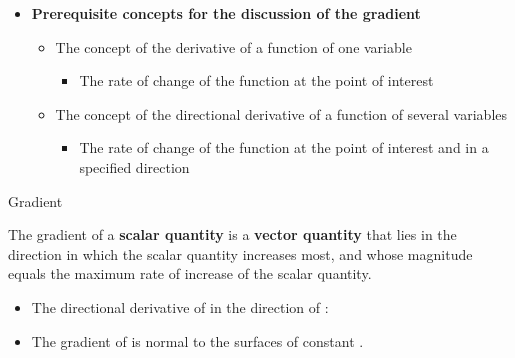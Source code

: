 
\begin{ELunit}

\begin{itemize}
\tightlist
\item
  \textbf{Prerequisite concepts for the discussion of the gradient}

  \begin{itemize}
  \tightlist
  \item
    The concept of the derivative of a function of one variable

    \begin{itemize}
    \tightlist
    \item
      The rate of change of the function at the point of interest
    \end{itemize}
  \item
    The concept of the directional derivative of a function of several variables

    \begin{itemize}
    \tightlist
    \item
      The rate of change of the function at the point of interest and in a specified direction
    \end{itemize}
  \end{itemize}
\end{itemize}


\end{ELunit}

\begin{ELdefinition}{Gradient}

The gradient of a \textbf{scalar quantity} is a \textbf{vector quantity} that lies in the direction in which the scalar quantity increases most, and whose magnitude equals the maximum rate of increase of the scalar quantity.


\end{ELdefinition}

\begin{ELunit}

\begin{itemize}
\tightlist
\item
  The directional derivative of  in the direction of \ELim{\dif\vect{\ell}}:
\end{itemize}


\begin{itemize}
\tightlist
\item
  The gradient of  is normal to the surfaces of constant .
\end{itemize}


\end{ELunit}

